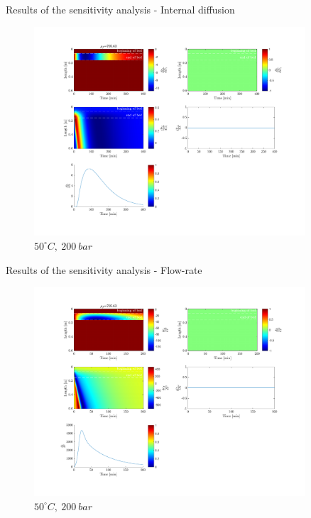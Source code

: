 \documentclass[8pt]{beamer}
\begin{document}
	\begin{frame}[fragile]{Results of the sensitivity analysis - Internal diffusion}
		\begin{figure}[h]
			\centering
			\includegraphics[trim = 2cm 2cm 2cm 1cm,clip,width=0.9\textwidth,center]{Figures/D_iT50P200.pdf}	
			\caption{$50^\circ C,~200~bar$}
		\end{figure}
	\end{frame}
%	
	
	\begin{frame}[fragile]{Results of the sensitivity analysis - Flow-rate}
		\begin{figure}[h]
			\centering
			\includegraphics[trim = 2cm 2cm 2cm 1cm,clip,width=0.9\textwidth,center]{Figures/FT50P200.pdf}	
			\caption{$50^\circ C,~200~bar$}
		\end{figure}
	\end{frame}
\end{document}
